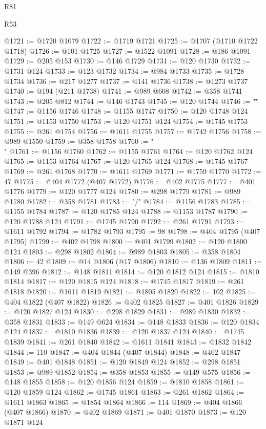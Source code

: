 \begin{lexlean}{R81}
\begin{lexlean}{R53}
\begin{coremodule}
{{{{{{{{{{{{{{{{{{{{{{{{{{{{{{{{{{{{{{{{{{{{{{{{{{{{{{{{{{{{{{{{{{{{{{{{{{{{{{{{{{{{{{{{{{{{{{{{{{{{{{{{{{{{{{{{@1721 := @1720 @1079
@1722 := @1719 @1721
@1725 := @1707 (@1710 @1722 @1718)
@1726 := @101 @1725
@1727 := @1522 @1091
@1728 := @186 @1091
@1729 := @205 @153
@1730 := @146 @1729
@1731 := @120 @1730
@1732 := @1731 @124
@1733 := @123 @1732
@1734 := @984 @1733
@1735 := @1728 @1734
@1736 := @217 @1277
@1737 := @141 @1736
@1738 := @1273 @1737
@1740 := @194 (@211 @1738)
@1741 := @989 @608
@1742 := @358 @1741
@1743 := @205 @812
@1744 := @146 @1743
@1745 := @120 @1744
@1746 := "\""
@1747 := @1156 @1746
@1748 := @1155 @1747
@1750 := @120 @1748 @124
@1751 := @1153 @1750
@1753 := @120 @1751 @124
@1754 := @1745 @1753
@1755 := @261 @1754
@1756 := @1611 @1755
@1757 := @1742 @1756
@1758 := @989 @1550
@1759 := @358 @1758
@1760 := "\\"
@1761 := @1156 @1760
@1762 := @1155 @1761
@1764 := @120 @1762 @124
@1765 := @1153 @1764
@1767 := @120 @1765 @124
@1768 := @1745 @1767
@1769 := @261 @1768
@1770 := @1611 @1769
@1771 := @1759 @1770
@1772 := 47
@1775 := @404 @1772 (@407 @1772)
@1776 := @402 @1775
@1777 := @401 @1776
@1779 := @120 @1777 @124
@1780 := @298 @1779
@1781 := @989 @1780
@1782 := @358 @1781
@1783 := "/"
@1784 := @1156 @1783
@1785 := @1155 @1784
@1787 := @120 @1785 @124
@1788 := @1153 @1787
@1790 := @120 @1788 @124
@1791 := @1745 @1790
@1792 := @261 @1791
@1793 := @1611 @1792
@1794 := @1782 @1793
@1795 := 98
@1798 := @404 @1795 (@407 @1795)
@1799 := @402 @1798
@1800 := @401 @1799
@1802 := @120 @1800 @124
@1803 := @298 @1802
@1804 := @989 @1803
@1805 := @358 @1804
@1806 := 42
@1809 := @14 @1806 (@17 @1806)
@1810 := @136 @1809
@1811 := @149 @396
@1812 := @148 @1811
@1814 := @120 @1812 @124
@1815 := @1810 @1814
@1817 := @120 @1815 @124
@1818 := @1745 @1817
@1819 := @261 @1818
@1820 := @1611 @1819
@1821 := @1805 @1820
@1822 := 102
@1825 := @404 @1822 (@407 @1822)
@1826 := @402 @1825
@1827 := @401 @1826
@1829 := @120 @1827 @124
@1830 := @298 @1829
@1831 := @989 @1830
@1832 := @358 @1831
@1833 := @149 @624
@1834 := @148 @1833
@1836 := @120 @1834 @124
@1837 := @1810 @1836
@1839 := @120 @1837 @124
@1840 := @1745 @1839
@1841 := @261 @1840
@1842 := @1611 @1841
@1843 := @1832 @1842
@1844 := 110
@1847 := @404 @1844 (@407 @1844)
@1848 := @402 @1847
@1849 := @401 @1848
@1851 := @120 @1849 @124
@1852 := @298 @1851
@1853 := @989 @1852
@1854 := @358 @1853
@1855 := @149 @575
@1856 := @148 @1855
@1858 := @120 @1856 @124
@1859 := @1810 @1858
@1861 := @120 @1859 @124
@1862 := @1745 @1861
@1863 := @261 @1862
@1864 := @1611 @1863
@1865 := @1854 @1864
@1866 := 114
@1869 := @404 @1866 (@407 @1866)
@1870 := @402 @1869
@1871 := @401 @1870
@1873 := @120 @1871 @124
}}}}}}}}}}}}}}}}}}}}}}}}}}}}}}}}}}}}}}}}}}}}}}}}}}}}}}}}}}}}}}}}}}}}}}}}}}}}}}}}}}}}}}}}}}}}}}}}}}}}}}}}}}}}}}}}
\end{coremodule}
\end{lexlean}
\end{lexlean}

